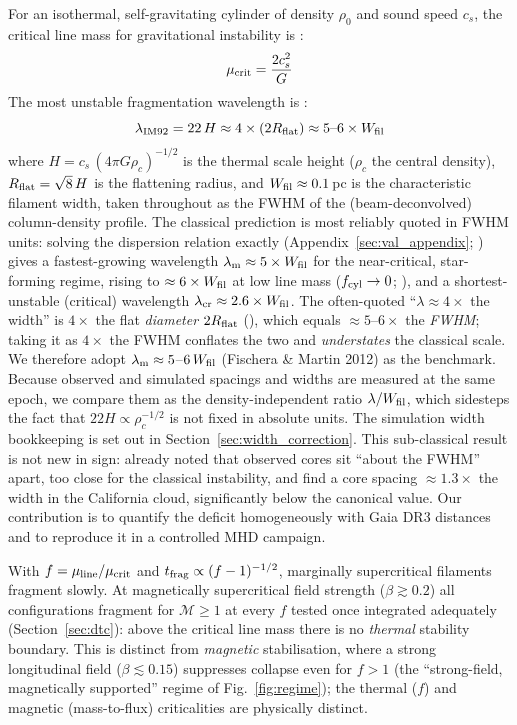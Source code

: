 \documentclass[usenatbib,twoside,twocolumn]{mnras}
\begin{document}
For an isothermal, self-gravitating cylinder of density $\rho_0$ and sound speed $c_s$, the critical line mass for gravitational instability is \citep{Ostriker1964}:
\begin{equation}
\mu_{\rm crit} = \frac{2c_s^2}{G}
\end{equation}
The most unstable fragmentation wavelength is \citep{Inutsuka1992}:
\begin{equation}
\lambda_{\rm IM92} = 22\,H \approx 4\times(2R_{\rm flat}) \approx 5\text{--}6\times W_{\rm fil}
\label{eq:im92}
\end{equation}
where $H = c_s\,(4\pi G\rho_c)^{-1/2}$ is the thermal scale height ($\rho_c$ the central density), $R_{\rm flat}=\sqrt8\,H$ is the flattening radius, and $W_{\rm fil}\approx0.1$\,pc is the characteristic filament width, taken throughout as the FWHM of the (beam-deconvolved) column-density profile. The classical prediction is most reliably quoted in FWHM units: solving the dispersion relation exactly (Appendix~\ref{sec:val_appendix}; \citealt{Fischera2012}) gives a fastest-growing wavelength $\lambda_{\rm m}\approx5\times W_{\rm fil}$ for the near-critical, star-forming regime, rising to $\approx6\times W_{\rm fil}$ at low line mass ($f_{\rm cyl}\to0$; \citealt{Fischera2012}), and a shortest-unstable (critical) wavelength $\lambda_{\rm cr}\approx2.6\times W_{\rm fil}$. The often-quoted ``$\lambda\approx4\times$ the width'' is $4\times$ the flat \emph{diameter} $2R_{\rm flat}$ (\citealt{Inutsuka1992}), which equals $\approx5$--$6\times$ the \emph{FWHM}; taking it as $4\times$ the FWHM conflates the two and \emph{understates} the classical scale. We therefore adopt $\lambda_{\rm m}\approx5$--$6\,W_{\rm fil}$ (Fischera \& Martin 2012) as the benchmark. Because observed and simulated spacings and widths are measured at the same epoch, we compare them as the density-independent ratio $\lambda/W_{\rm fil}$, which sidesteps the fact that $22H\propto\rho_c^{-1/2}$ is not fixed in absolute units. The simulation width bookkeeping is set out in Section~\ref{sec:width_correction}. This sub-classical result is not new in sign: \citet{Fischera2012} already noted that observed cores sit ``about the FWHM'' apart, too close for the classical instability, and \citet{Zhang2023cal} find a core spacing $\approx1.3\times$ the width in the California cloud, significantly below the canonical value. Our contribution is to quantify the deficit homogeneously with Gaia DR3 distances and to reproduce it in a controlled MHD campaign.

With $f=\mu_{\rm line}/\mu_{\rm crit}$ and $t_{\rm frag}\propto(f-1)^{-1/2}$, marginally supercritical filaments fragment slowly. At magnetically supercritical field strength ($\beta\gtrsim0.2$) all configurations fragment for $\mathcal{M}\geq1$ at every $f$ tested once integrated adequately (Section~\ref{sec:dtc}): above the critical line mass there is no \emph{thermal} stability boundary. This is distinct from \emph{magnetic} stabilisation, where a strong longitudinal field ($\beta\lesssim0.15$) suppresses collapse even for $f>1$ (the ``strong-field, magnetically supported'' regime of Fig.~\ref{fig:regime}); the thermal ($f$) and magnetic (mass-to-flux) criticalities are physically distinct.
\end{document}
